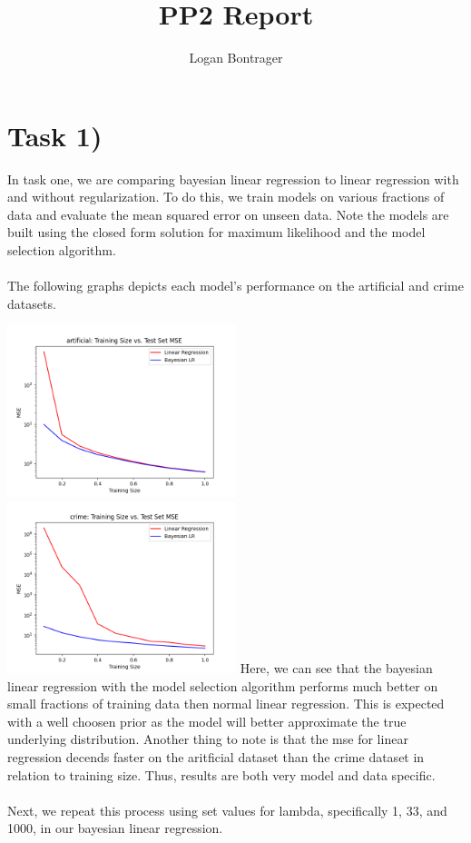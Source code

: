 \documentclass{article}
\begin{document}
\title{PP2 Report}
\author{Logan Bontrager}
\maketitle

\section*{Task 1)}

In task one, we are comparing bayesian linear regression to linear regression with and without regularization. To do this, we train models on various fractions of data and evaluate the mean squared error on unseen data. Note the models are built using the closed form solution for maximum likelihood and the model selection algorithm. 
\\ \\
The following graphs depicts each model's performance on the artificial and crime datasets.

\includegraphics[width=0.5\textwidth]{../output/task1iiartificial.png}
\includegraphics[width=0.5\textwidth]{../output/task1iicrime.png}
Here, we can see that the bayesian linear regression with the model selection algorithm performs much better on small fractions of training data then normal linear regression. This is expected with a well choosen prior as the model will better approximate the true underlying distribution. Another thing to note is that the mse for linear regression decends faster on the aritficial dataset than the crime dataset in relation to training size. Thus, results are both very model and data specific.
\\ \\
Next, we repeat this process using set values for lambda, specifically 1, 33, and 1000, in our bayesian linear regression.
\end{document}
